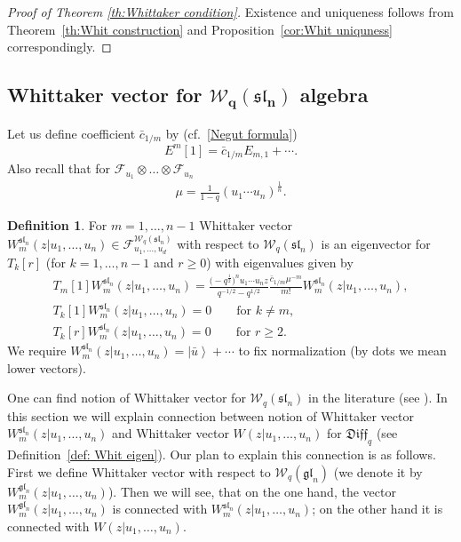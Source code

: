 \documentclass[pdftex]{sigma}
\numberwithin{equation}{section}
\theoremstyle{definition}
\newtheorem{Definition}[Theorem]{Definition}
\newcommand{\half}{\frac{1}{2}}
\newcommand{\qD}{\mathfrak{Diff}_q}
\newcommand{ \W }{ \mathcal{W}_{q} ( \mathfrak{sl}_n ) }
\newcommand{ \Wgl }{ \mathcal{W}_{q} ( \mathfrak{gl}_n ) }
\newcommand{\nWFock}{\mathcal{F}^{\W}_{u_1, \dots, u_d}}
\newcommand{\vacF}{ \left| \bar{u} \right\rangle}
\begin{document}
\begin{proof}[Proof of Theorem \ref{th:Whittaker condition}]
Existence and uniqueness follows from Theorem~\ref{th:Whit construction} and Proposition~\ref{cor:Whit uniquness} correspondingly.
\end{proof}

\subsection[Whittaker vector for $\W$ algebra]{Whittaker vector for $\boldsymbol{\W}$ algebra}
Let us define coefficient $\bar{c}_{1/m}$ by (cf.\ \eqref{Negut formula})
\begin{equation} \label{eq: notation for c}
E^m[1]= \bar{c}_{1/m} E_{m,1} + \cdots.
\end{equation}
Also recall that for $\mathcal{F}_{u_1} \otimes \dots \otimes \mathcal{F}_{u_n}$
\begin{gather*}
\mu = \frac{1}{1-q} (u_1 \cdots u_n)^{\frac{1}{n}}.
\end{gather*}
\begin{Definition}
For $m=1, \dots, n-1$ Whittaker vector $W_m^{\mathfrak{sl}_n}(z| u_1, \dots, u_n) \in \nWFock$ with respect to $\W$ is an eigenvector for $T_k[r]$ (for $k= 1, \dots, n-1$ and $r \geqslant 0$) with eigenvalues given by
\begin{gather*}
T_{m}[1] W_m^{\mathfrak{sl}_n}(z| u_1, \dots, u_n) = \frac{\big( {-}q^{\half} \big)^nu_1 \cdots u_n z}{q^{-1/2}-q^{1/2}} \frac{\bar{c}_{1/m} \mu^{-m}}{m!} W_m^{\mathfrak{sl}_n}(z| u_1, \dots, u_n), \\
T_{k}[1] W_m^{\mathfrak{sl}_n}(z| u_1, \dots, u_n) =0 \qquad \text{for $k \neq m$},\\
T_{k}[r] W_m^{\mathfrak{sl}_n}(z| u_1, \dots, u_n) =0 \qquad \text{for $r \geqslant 2$}.
\end{gather*}
We require $W_m^{\mathfrak{sl}_n}(z| u_1, \dots, u_n) = \vacF + \cdots$ to fix normalization (by dots we mean lower vectors).
\end{Definition}
One can find notion of Whittaker vector for $\W$ in the literature (see \cite{T}). In this section we will explain connection between notion of Whittaker vector $W_m^{\mathfrak{sl}_n}(z| u_1, \dots, u_n)$ and Whittaker vector $W(z| u_1, \dots , u_n)$ for $\qD$ (see Definition~\ref{def: Whit eigen}). Our plan to explain this connection is as follows. First we define Whittaker vector with respect to $\Wgl$ (we denote it by $W_m^{\mathfrak{gl}_n}(z| u_1, \dots, u_n)$). Then we will see, that on the one hand, the vector $W_m^{\mathfrak{gl}_n}(z| u_1, \dots, u_n)$ is connected with $W_m^{\mathfrak{sl}_n}(z| u_1, \dots, u_n)$; on the other hand it is connected with $W(z| u_1, \dots , u_n)$.
\end{document}
